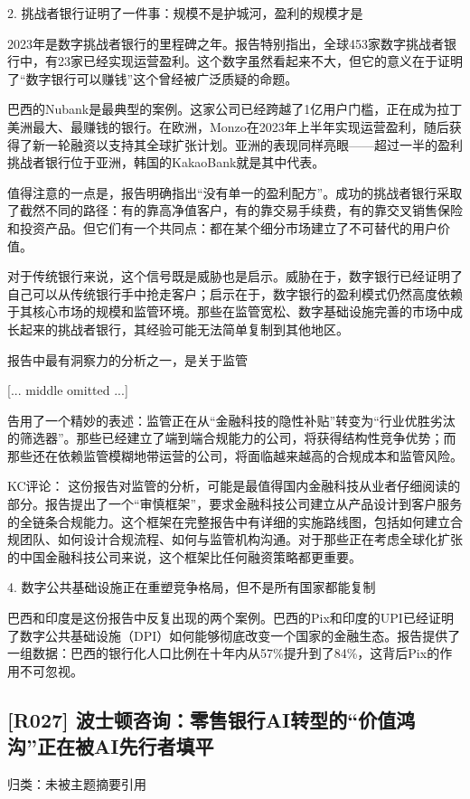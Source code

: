 \documentclass[11pt]{ctexart}
\begin{document}
2. 挑战者银行证明了一件事：规模不是护城河，盈利的规模才是

2023年是数字挑战者银行的里程碑之年。报告特别指出，全球453家数字挑战者银行中，有23家已经实现运营盈利。这个数字虽然看起来不大，但它的意义在于证明了“数字银行可以赚钱”这个曾经被广泛质疑的命题。

巴西的Nubank是最典型的案例。这家公司已经跨越了1亿用户门槛，正在成为拉丁美洲最大、最赚钱的银行。在欧洲，Monzo在2023年上半年实现运营盈利，随后获得了新一轮融资以支持其全球扩张计划。亚洲的表现同样亮眼——超过一半的盈利挑战者银行位于亚洲，韩国的KakaoBank就是其中代表。

值得注意的一点是，报告明确指出“没有单一的盈利配方”。成功的挑战者银行采取了截然不同的路径：有的靠高净值客户，有的靠交易手续费，有的靠交叉销售保险和投资产品。但它们有一个共同点：都在某个细分市场建立了不可替代的用户价值。

对于传统银行来说，这个信号既是威胁也是启示。威胁在于，数字银行已经证明了自己可以从传统银行手中抢走客户；启示在于，数字银行的盈利模式仍然高度依赖于其核心市场的规模和监管环境。那些在监管宽松、数字基础设施完善的市场中成长起来的挑战者银行，其经验可能无法简单复制到其他地区。

报告中最有洞察力的分析之一，是关于监管

[... middle omitted ...]

告用了一个精妙的表述：监管正在从“金融科技的隐性补贴”转变为“行业优胜劣汰的筛选器”。那些已经建立了端到端合规能力的公司，将获得结构性竞争优势；而那些还在依赖监管模糊地带运营的公司，将面临越来越高的合规成本和监管风险。

KC评论： 这份报告对监管的分析，可能是最值得国内金融科技从业者仔细阅读的部分。报告提出了一个“审慎框架”，要求金融科技公司建立从产品设计到客户服务的全链条合规能力。这个框架在完整报告中有详细的实施路线图，包括如何建立合规团队、如何设计合规流程、如何与监管机构沟通。对于那些正在考虑全球化扩张的中国金融科技公司来说，这个框架比任何融资策略都更重要。

4. 数字公共基础设施正在重塑竞争格局，但不是所有国家都能复制

巴西和印度是这份报告中反复出现的两个案例。巴西的Pix和印度的UPI已经证明了数字公共基础设施（DPI）如何能够彻底改变一个国家的金融生态。报告提供了一组数据：巴西的银行化人口比例在十年内从57\%提升到了84\%，这背后Pix的作用不可忽视。

\subsection{[R027] 波士顿咨询：零售银行AI转型的“价值鸿沟”正在被AI先行者填平}
{\small\color{refgray}归类：未被主题摘要引用}
\end{document}
